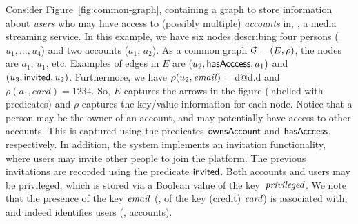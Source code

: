 
\begin{example}
  \label{ex:common-graph}
  Consider Figure~\ref{fig:common-graph}, containing a graph to store
  information about \emph{users} who may have access to (possibly multiple)
  \emph{accounts} in, \eg, a media streaming service.
  In this example, we have six nodes describing four persons ($u_1,...,u_4$) and
  two accounts ($a_1$, $a_2$).
  As a common graph $\mathcal{G} = (E, \rho)$, the nodes are $a_1$, $u_1$, etc.
  Examples of edges in $E$ are $(u_2, \mathsf{hasAcccess},a_1)$ and $(u_3, \mathsf{invited},
  u_2)$.
  Furthermore, we have $\rho(u_2, \mathit{email}) =$ d@d.d and $\rho(a_1,card) =
  1234$.
  So, $E$ captures the arrows in the figure (labelled with predicates) and
  $\rho$ captures the key/value information for each node.
  Notice that a person may be the owner of an account, and may potentially have
  access to other accounts.
  This is captured using the predicates $\mathsf{ownsAccount}$ and $\mathsf{hasAcccess}$, respectively.
  In addition, the system implements an invitation functionality, where users
  may invite other people to join the platform.
  The previous invitations are recorded using the predicate $\mathsf{invited}$.
  Both accounts and users may be privileged, which is stored via a Boolean value
  of the key~$\mathit{privileged}$.
  We note that the presence of the key $\mathit{email}$ (\resp, of the key (credit)
  $\mathit{card}$) is associated with, and indeed identifies users (\resp, accounts).
\end{example}

